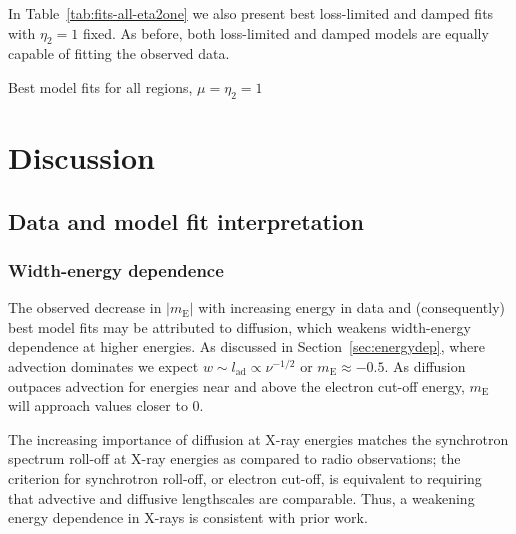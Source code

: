 \documentclass[iop, apj, numberedappendix]{emulateapj}
\newcommand*{\mt}{\mathrm}
\newcommand*{\mE}{m_\mt{E}}
\begin{document}
In Table~\ref{tab:fits-all-eta2one} we also present best loss-limited and
damped fits with $\eta_2 = 1$ fixed.  As before, both loss-limited and damped
models are equally capable of fitting the observed data.

\begin{table}
    \scriptsize
    \centering
    \caption{Best model fits for all regions, $\mu = \eta_2 = 1$
    \label{tab:fits-all-eta2one}}
    
\end{table}


\section{Discussion}

\subsection{Data and model fit interpretation}

\subsubsection{Width-energy dependence}

The observed decrease in $|\mE|$ with increasing energy in data and
(consequently) best model fits may be attributed to diffusion, which weakens
width-energy dependence at higher energies.
As discussed in Section~\ref{sec:energydep}, where advection dominates we
expect $w \sim l_{\mt{ad}} \propto \nu^{-1/2}$ or $\mE \approx -0.5$.  As
diffusion outpaces advection for energies near and above the electron cut-off
energy, $\mE$ will approach values closer to $0$.

The increasing importance of diffusion at X-ray energies matches the
synchrotron spectrum roll-off at X-ray energies as compared to radio
observations; the criterion for synchrotron roll-off, or electron cut-off, is
equivalent to requiring that advective and diffusive lengthscales are
comparable.  Thus, a weakening energy dependence in X-rays is consistent with
prior work.
\end{document}
